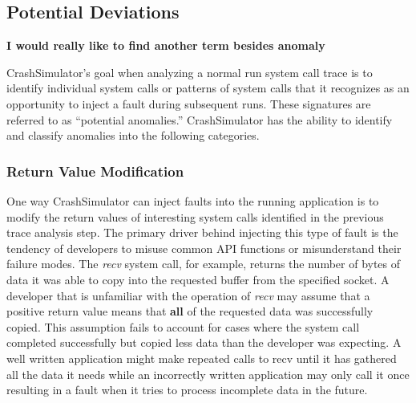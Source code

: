 
    \subsection{Potential Deviations}

        \textbf{I would really like to find another term besides anomaly}

        CrashSimulator's goal when analyzing a normal run system call trace is to identify individual system calls or
        patterns of system calls that it recognizes as an opportunity to inject a fault during subsequent runs. These
        signatures are referred to as ``potential anomalies.'' CrashSimulator has the ability to identify and classify
        anomalies into the following categories.

        \subsubsection{Return Value Modification}

            One way CrashSimulator can inject faults into the running application is to modify the return values of
            interesting system calls identified in the previous trace analysis step. The primary driver behind injecting
            this type of fault is the tendency of developers to misuse common API functions or misunderstand their
            failure modes. The \emph{recv} system call, for example, returns the number of bytes of data it was able to
            copy into the requested buffer from the specified socket. A developer that is unfamiliar with the operation
            of \emph{recv} may assume that a positive return value means that \textbf{all} of the requested data was
            successfully copied. This assumption fails to account for cases where the system call completed successfully
            but copied less data than the developer was expecting. A well written application might make repeated calls
            to recv until it has gathered all the data it needs while an incorrectly written application may only call
            it once resulting in a fault when it tries to process incomplete data in the future.

